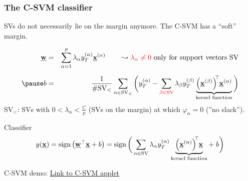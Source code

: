 \begin{frame}\frametitle{The C-SVM classifier}

SVs do not necessarily lie on the margin anymore. The C-SVM has a ``soft'' margin.

\slidesonly{\vspace{-3mm}}

	\begin{eqnarray*}
		\vec{w} &=& \sum\limits_{\alpha = 1}^p \lambda_\alpha y_T^{(\alpha)}
			\vec{x}^{(\alpha)} \qquad
		\leadsto {\color{red}\lambda_\alpha \neq 0} \text{ only for support vectors }\mathrm{SV}\\[2mm]
		\pause
		b &=& \frac{1}{\# \mathrm{SV}_<} \sum\limits_{\alpha \in \mathrm{SV}_<} \bigg( y_T^{(\alpha)}
			- \sum\limits_{\color{red}\beta \in \mathrm{SV}} \lambda_\beta y_T^{(\beta)} 
			\underbrace{ \Big( \vec{x}^{(\beta)} \Big)^{\kern-0.6ex\top} 
				\kern-0.2ex\vec{x}^{(\alpha)}}_{\text{kernel function}}
			\bigg)
	\end{eqnarray*}
	\vspace{2mm}
	$\mathrm{SV}_<$: $\mathrm{SV}$s with $0 < \lambda_\alpha < \frac{C}{p}$ 
	($\mathrm{SV}$s on the margin) at which $\varphi_\alpha = 0$ (''no slack'').
	
	
	\pause

	\begin{block}{Classifier}
	\begin{equation*}
		y(\underline{\mathbf{x}}) = \operatorname{sign} \big( \underline{\mathbf{w}}^\top \underline{\mathbf{x}} + b \big) 
		= \operatorname{sign} \bigg( \sum\limits_{\alpha \in \mathrm{SV}} \lambda_\alpha y_T^{(\alpha)} 
			\underbrace{ \Big( \underline{\mathbf{x}}^{(\alpha)} \Big)^{\kern-0.6ex\top} 
				\kern-0.2ex \underline{\mathbf{x}}}_{
				\text{kernel function}} + \;b
			\bigg)
	\end{equation*}
	\end{block}
\end{frame}

\begin{frame}
C-SVM demo: \href{https://cs.stanford.edu/people/karpathy/svmjs/demo/}{Link to C-SVM applet}
\end{frame}
